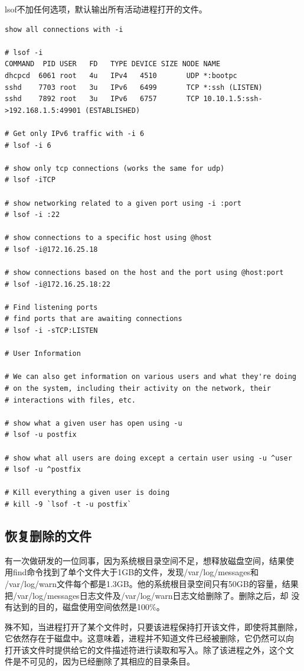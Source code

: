 lsof不加任何选项，默认输出所有活动进程打开的文件。

\begin{verbatim}
show all connections with -i

# lsof -i
COMMAND  PID USER   FD   TYPE DEVICE SIZE NODE NAME
dhcpcd  6061 root   4u   IPv4   4510       UDP *:bootpc
sshd    7703 root   3u   IPv6   6499       TCP *:ssh (LISTEN)
sshd    7892 root   3u   IPv6   6757       TCP 10.10.1.5:ssh->192.168.1.5:49901 (ESTABLISHED)

# Get only IPv6 traffic with -i 6
# lsof -i 6

# show only tcp connections (works the same for udp)
# lsof -iTCP

# show networking related to a given port using -i :port
# lsof -i :22

# show connections to a specific host using @host
# lsof -i@172.16.25.18

# show connections based on the host and the port using @host:port
# lsof -i@172.16.25.18:22

# Find listening ports
# find ports that are awaiting connections
# lsof -i -sTCP:LISTEN

# User Information

# We can also get information on various users and what they're doing
# on the system, including their activity on the network, their
# interactions with files, etc.

# show what a given user has open using -u
# lsof -u postfix

# show what all users are doing except a certain user using -u ^user
# lsof -u ^postfix

# Kill everything a given user is doing
# kill -9 `lsof -t -u postfix`
\end{verbatim}

\subsection{恢复删除的文件}

有一次做研发的一位同事，因为系统根目录空间不足，想释放磁盘空间，结果使
用find命令找到了单个文件大于1GB的文件，发现/var/log/messages和
/var/log/warn文件每个都是1.3GB。他的系统根目录空间只有50GB的容量，结果
把/var/log/messages日志文件及/var/log/warn日志文给删除了。删除之后，却
没有达到的目的，磁盘使用空间依然是100\%。

殊不知，当进程打开了某个文件时，只要该进程保持打开该文件，即使将其删除，
它依然存在于磁盘中。这意味着，进程并不知道文件已经被删除，它仍然可以向
打开该文件时提供给它的文件描述符进行读取和写入。除了该进程之外，这个文
件是不可见的，因为已经删除了其相应的目录条目。

